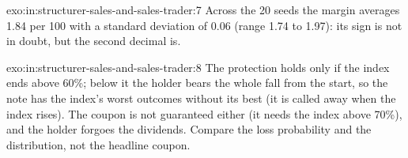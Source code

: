 \begin{solution}{exo:in:structurer-sales-and-sales-trader:7}
Across the 20 seeds the margin averages 1.84 per 100 with a standard deviation of 0.06 (range 1.74 to 1.97): its sign is
not in doubt, but the second decimal is.
\end{solution}

\begin{solution}{exo:in:structurer-sales-and-sales-trader:8}
The protection holds only if the index ends above 60\%; below it the holder bears the whole fall from the start, so
the note has the index's worst outcomes without its best (it is called away when the index rises). The coupon is not
guaranteed either (it needs the index above 70\%), and the holder forgoes the dividends. Compare the loss probability and
the distribution, not the headline coupon.
\end{solution}

